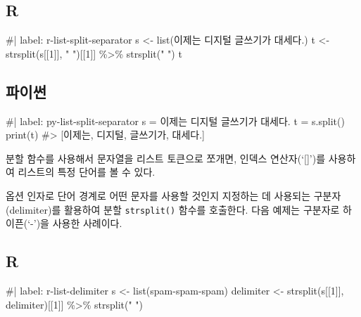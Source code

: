 \documentclass[
  letterpaper,
]{book}
\newenvironment{Shaded}{\begin{snugshade}}{\end{snugshade}}
\newcommand{\NormalTok}[1]{\textcolor[rgb]{0.00,0.23,0.31}{#1}}
\begin{document}
\subsection{R}

\begin{Shaded}
\begin{Highlighting}[]
\NormalTok{\#| label: r{-}list{-}split{-}separator}
\NormalTok{s \textless{}{-} list(\textquotesingle{}이제는 디지털 글쓰기가 대세다.\textquotesingle{})}
\NormalTok{t \textless{}{-} strsplit(s[[1]], " ")[[1]] \%\textgreater{}\% strsplit(" ")}
\NormalTok{t}
\end{Highlighting}
\end{Shaded}

\subsection{파이썬}

\begin{Shaded}
\begin{Highlighting}[]
\NormalTok{\#| label: py{-}list{-}split{-}separator}
\NormalTok{s = \textquotesingle{}이제는 디지털 글쓰기가 대세다.\textquotesingle{}}
\NormalTok{t = s.split()}
\NormalTok{print(t)}
\NormalTok{\#\textgreater{} [\textquotesingle{}이제는\textquotesingle{}, \textquotesingle{}디지털\textquotesingle{}, \textquotesingle{}글쓰기가\textquotesingle{}, \textquotesingle{}대세다.\textquotesingle{}]}
\end{Highlighting}
\end{Shaded}

분할 함수를 사용해서 문자열을 리스트 토큰으로 쪼개면, 인덱스
연산자(`{[}{]}')를 사용하여 리스트의 특정 단어를 볼 수 있다.

옵션 인자로 단어 경계로 어떤 문자를 사용할 것인지 지정하는 데 사용되는
구분자(delimiter)를 활용하여 분할 \texttt{strsplit()} 함수를 호출한다.
다음 예제는 구분자로 하이픈(`-')을 사용한 사례이다. 
 

\subsection{R}

\begin{Shaded}
\begin{Highlighting}[]
\NormalTok{\#| label: r{-}list{-}delimiter}
\NormalTok{s \textless{}{-} list(\textquotesingle{}spam{-}spam{-}spam\textquotesingle{})}
\NormalTok{delimiter \textless{}{-} \textquotesingle{}{-}\textquotesingle{}}
\NormalTok{strsplit(s[[1]], delimiter)[[1]] \%\textgreater{}\% strsplit(" ")}
\end{Highlighting}
\end{Shaded}
\end{document}
